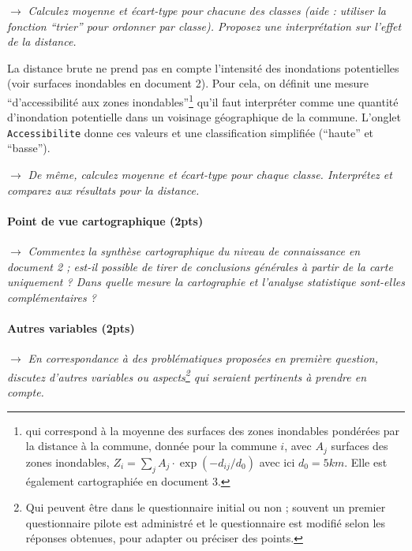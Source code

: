 \medskip

$\rightarrow$ \textit{Calculez moyenne et écart-type pour chacune des classes (aide : utiliser la fonction ``trier'' pour ordonner par classe). Proposez une interprétation sur l'effet de la distance.}


La distance brute ne prend pas en compte l'intensité des inondations potentielles (voir surfaces inondables en document 2). Pour cela, on définit une mesure ``d'accessibilité aux zones inondables''\footnote{qui correspond à la moyenne des surfaces des zones inondables pondérées par la distance à la commune, donnée pour la commune $i$, avec $A_j$ surfaces des zones inondables, $Z_i = \sum_j A_j\cdot \exp\left(- d_{ij}/d_0 \right)$ avec ici $d_0=5km$. Elle est également cartographiée en document 3.} qu'il faut interpréter comme une quantité d'inondation potentielle dans un voisinage géographique de la commune. L'onglet \texttt{Accessibilite} donne ces valeurs et une classification simplifiée (``haute'' et ``basse'').

\medskip

$\rightarrow$ \textit{De même, calculez moyenne et écart-type pour chaque classe. Interprétez et comparez aux résultats pour la distance.}


\paragraph{Point de vue cartographique (2pts)}

$\rightarrow$ \textit{Commentez la synthèse cartographique du niveau de connaissance en document 2 ; est-il possible de tirer de conclusions générales à partir de la carte uniquement ? Dans quelle mesure la cartographie et l'analyse statistique sont-elles complémentaires ?}







\paragraph{Autres variables (2pts)}

$\rightarrow$ \textit{En correspondance à des problématiques proposées en première question, discutez d'autres variables ou aspects\footnote{Qui peuvent être dans le questionnaire initial ou non ; souvent un premier questionnaire pilote est administré et le questionnaire est modifié selon les réponses obtenues, pour adapter ou préciser des points.} qui seraient pertinents à prendre en compte.}


